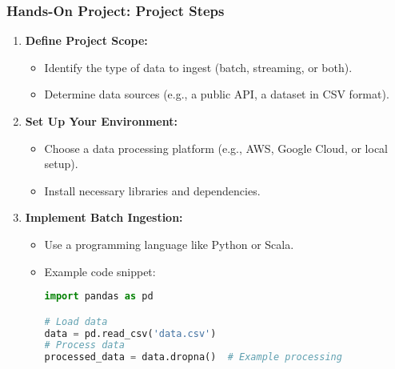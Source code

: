 \documentclass[aspectratio=169]{beamer}
\begin{document}
\begin{frame}[fragile]
    \frametitle{Hands-On Project: Project Steps}
    \begin{enumerate}
        \item \textbf{Define Project Scope:}
            \begin{itemize}
                \item Identify the type of data to ingest (batch, streaming, or both).
                \item Determine data sources (e.g., a public API, a dataset in CSV format).
            \end{itemize}
        \item \textbf{Set Up Your Environment:}
            \begin{itemize}
                \item Choose a data processing platform (e.g., AWS, Google Cloud, or local setup).
                \item Install necessary libraries and dependencies.
            \end{itemize}
        \item \textbf{Implement Batch Ingestion:}
            \begin{itemize}
                \item Use a programming language like Python or Scala.
                \item Example code snippet:
                \begin{lstlisting}[language=Python]
import pandas as pd

# Load data
data = pd.read_csv('data.csv')
# Process data
processed_data = data.dropna()  # Example processing
                \end{lstlisting}
            \end{itemize}
    \end{enumerate}
\end{frame}
\end{document}
